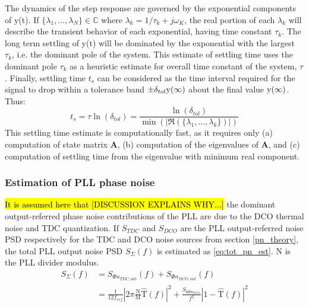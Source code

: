 
	The dynamics of the step response are governed by the exponential components of y(t). If  $\{\lambda_1, ... , \lambda_N\} \in \mathds{C}$ where $\lambda_k=1/\tau_k+j\omega_K$, the real portion of each $\lambda_k$ will describe the transient behavior of each exponential, having time constant $\tau_k$. The long term settling of y(t) will be dominated by the exponential with the largest $\tau_k$, i.e. the dominant pole of the system. This estimate of settling time uses the dominant pole $\tau_k$ as a heuristic estimate for overall time constant of the system, $\tau$. Finally, settling time $t_s$ can be considered as the time interval required for the signal to drop within a tolerance band $\pm \delta_{tol} \textnormal{y}(\infty)$ about the final value $\textnormal{y}(\infty)$. Thus:
	\begin{equation}
		t_s = \tau\ln(\delta_{tol}) = \frac{\ln(\delta_{tol})}{\min(|\Re(\{\lambda_1, ... , \lambda_k\})|)}
	\end{equation}
	This settling time estimate is computationally fast, as it requires only (a) computation of state matrix $\mathbf{A}$, (b) computation of the eigenvalues of $\mathbf{A}$, and (c) computation of settling time from the eigenvalue with minimum real component.

\subsubsection{Estimation of PLL phase noise}
	\hl{It is assumed here that [DISCUSSION EXPLAINS WHY...]} the dominant output-referred phase noise contributions of the PLL are due to the DCO thermal noise and TDC quantization. If $S_{TDC}$ and $S_{DCO}$ are the PLL output-referred noise PSD respectively for the TDC and DCO noise sources from section \ref{pn_theory}, the total PLL output noise PSD $S_{\Sigma}(f)$ is estimated as \ref{eq:tot_pn_est}. N is the PLL divider modulus.
	\begin{align}\label{eq:tot_pn_est}
		S_{\Sigma}(f) &= S_{\Phi n_{TDC,out}}(f) + S_{\Phi n_{DCO,out}}(f)\\
		 &= \frac{1}{12f_{ref}}\left|2\pi\frac{\mathrm{N}}{\mathrm{M}}\hat{\mathrm{T}}(f)\right|^2 + \frac{S_{0\Phi n_{DCO}}}{f^2}\left|1-\hat{\mathrm{T}}(f)\right|^2
	\end{align}

